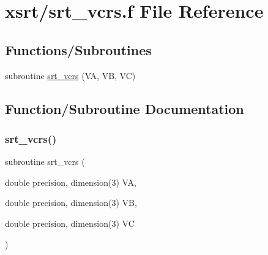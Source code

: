 \hypertarget{srt__vcrs_8f}{}\section{xsrt/srt\+\_\+vcrs.f File Reference}
\label{srt__vcrs_8f}
\subsection*{Functions/\+Subroutines}
\begin{DoxyCompactItemize}
\item 
subroutine \hyperlink{srt__vcrs_8f_acc5d93d10aaa2b808da083ecb5e13ffc}{srt\+\_\+vcrs} (VA, VB, VC)
\end{DoxyCompactItemize}


\subsection{Function/\+Subroutine Documentation}
\mbox{\label{srt__vcrs_8f_acc5d93d10aaa2b808da083ecb5e13ffc}} 
\subsubsection{\texorpdfstring{srt\+\_\+vcrs()}{srt\_vcrs()}}
{\footnotesize\ttfamily subroutine srt\+\_\+vcrs (\begin{DoxyParamCaption}\item[{double precision, dimension(3)}]{VA,  }\item[{double precision, dimension(3)}]{VB,  }\item[{double precision, dimension(3)}]{VC }\end{DoxyParamCaption})}


